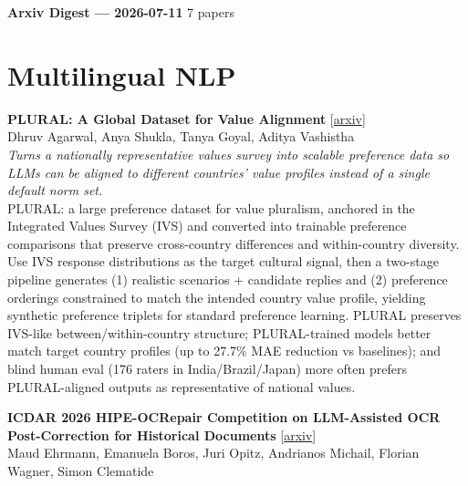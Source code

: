 \documentclass[12pt,letterpaper]{article}
\begin{document}
{\footnotesize\textbf{Arxiv Digest --- 2026-07-11} \hfill 7 papers}

\smallskip

\section*{Multilingual NLP}

{\small\textbf{PLURAL: A Global Dataset for Value Alignment}} {\scriptsize[\href{https://arxiv.org/abs/2607.08034}{arxiv}]}\\
{\scriptsize Dhruv Agarwal, Anya Shukla, Tanya Goyal, Aditya Vashistha}\\

{\small\textit{Turns a nationally representative values survey into scalable preference data so LLMs can be aligned to different countries' value profiles instead of a single default norm set.}}\\[1pt]
{\footnotesize PLURAL: a large preference dataset for value pluralism, anchored in the Integrated Values Survey (IVS) and converted into trainable preference comparisons that preserve cross-country differences and within-country diversity. Use IVS response distributions as the target cultural signal, then a two-stage pipeline generates (1) realistic scenarios + candidate replies and (2) preference orderings constrained to match the intended country value profile, yielding synthetic preference triplets for standard preference learning. PLURAL preserves IVS-like between/within-country structure; PLURAL-trained models better match target country profiles (up to 27.7\% MAE reduction vs baselines); and blind human eval (176 raters in India/Brazil/Japan) more often prefers PLURAL-aligned outputs as representative of national values.}

\medskip

{\small\textbf{ICDAR 2026 HIPE-OCRepair Competition on LLM-Assisted OCR Post-Correction for Historical Documents}} {\scriptsize[\href{https://arxiv.org/abs/2607.08143}{arxiv}]}\\
{\scriptsize Maud Ehrmann, Emanuela Boros, Juri Opitz, Andrianos Michail, Florian Wagner, Simon Clematide}\\
\end{document}
